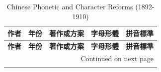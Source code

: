 \documentclass[a5paper, 12pt, openany]{book} %
\begin{document}
\begin{longtable}{|p{1.3cm}|p{1cm}|p{2.5cm}|p{2cm}|p{2cm}|}

\caption{Chinese Phonetic and Character Reforms (1892-1910)} \\
\hline
\textbf{作者} & \textbf{年份} & \textbf{著作或方案} & \textbf{字母形體} & \textbf{拼音標準} \\ \hline
\endfirsthead

\hline
\textbf{作者} & \textbf{年份} & \textbf{著作或方案} & \textbf{字母形體} & \textbf{拼音標準} \\ \hline
\endhead

\hline \multicolumn{5}{|r|}{{Continued on next page}} \\ \hline
\endfoot

\hline
\endlastfoot


\end{longtable}
\end{document}
